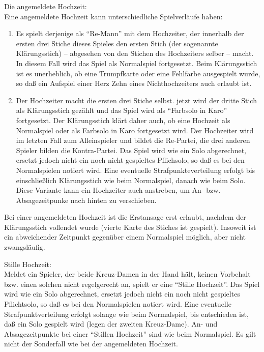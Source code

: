 \documentclass[12pt]{scrartcl}
\begin{document}
Die angemeldete Hochzeit:\\
Eine angemeldete Hochzeit kann unterschiedliche Spielverläufe haben:
\begin{enumerate}
  \item
    Es spielt derjenige als "`Re-Mann"' mit dem Hochzeiter, der
    innerhalb der ersten drei Stiche dieses Spieles den ersten Stich
    (der sogenannte Klärungsstich) -- abgesehen von den Stichen des
    Hochzeiters selber -- macht. In diesem Fall wird das Spiel als
    Normalspiel fortgesetzt. Beim Klärungsstich ist es unerheblich,
    ob eine Trumpfkarte oder eine Fehlfarbe ausgespielt wurde, so
    daß ein Aufspiel einer Herz Zehn eines Nichthochzeiters auch
    erlaubt ist.
  \item
    Der Hochzeiter macht die ersten drei Stiche selbst. jetzt wird
    der dritte Stich als Klärungsstich gezählt und das Spiel wird
    als "`Farbsolo in Karo"' fortgesetzt. Der Klärungsstich klärt
    daher auch, ob eine Hochzeit als Normalspiel oder als Farbsolo in
    Karo fortgesetzt wird. Der Hochzeiter wird im letzten Fall zum
    Alleinspieler und bildet die Re-Partei, die drei anderen Spieler
    bilden die Kontra-Partei. Das Spiel wird wie ein Solo
    abgerechnet, ersetzt jedoch nicht ein noch nicht gespieltes
    Pflichsolo, so daß es bei den Normalspielen notiert wird. Eine
    eventuelle Strafpunkteverteilung erfolgt bis einschließlich
    Klärungsstich wie beim Normalspiel, danach wie beim Solo. Diese
    Variante kann ein Hochzeiter auch anstreben, um An- bzw.
    Absagezeitpunke nach hinten zu verschieben.
\end{enumerate}
Bei einer angemeldeten Hochzeit ist die Erstansage erst erlaubt,
nachdem der Klärungsstich vollendet wurde (vierte Karte des
Stiches ist gespielt). Insoweit ist ein abweichender Zeitpunkt
gegenüber einem Normalspiel möglich, aber nicht zwangsläufig.

Stille Hochzeit:\\
Meldet ein Spieler, der beide Kreuz-Damen in der Hand hält,
keinen Vorbehalt bzw. einen solchen nicht regelgerecht an, spielt
er eine "`Stille Hochzeit"'. Das Spiel wird wie ein Solo
abgerechnet, ersetzt jedoch nicht ein noch nicht gespieltes
Pflichtsolo, so daß es bei den Normalspielen notiert wird. Eine
eventuelle Strafpunktverteilung erfolgt solange wie beim
Normalspiel, bis entschieden ist, daß ein Solo gespielt wird
(legen der zweiten Kreuz-Dame). An- und Absagezeitpunkte bei einer
"`Stillen Hochzeit"' sind wie beim Normalspiel. Es gilt nicht der
Sonderfall wie bei der angemeldeten Hochzeit.
\end{document}
